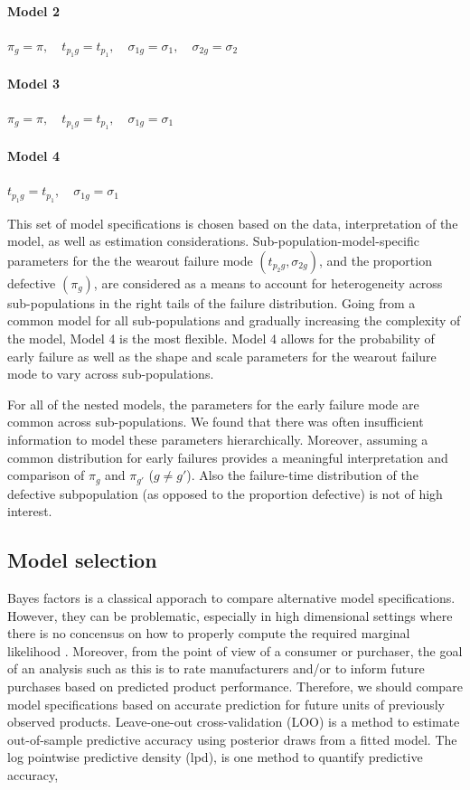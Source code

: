 \documentclass[12pt]{article}
\begin{document}
\paragraph{Model 2} $\pi_{g} = \pi,\quad t_{p_{1}g} = t_{p_1},\quad \sigma_{1g}=\sigma_1,\quad \sigma_{2g} = \sigma_2$
\paragraph{Model 3} $\pi_{g} = \pi,\quad  t_{p_{1}g}= t_{p_1},\quad \sigma_{1g}=\sigma_1$
\paragraph{Model 4} $t_{p_{1}g}= t_{p_1},\quad \sigma_{1g}=\sigma_1$


This set of model specifications is chosen based on the data, interpretation of the model, as well as estimation considerations.  Sub-population-model-specific parameters for the the wearout failure mode $(t_{p_{2}g},\sigma_{2g})$, and the proportion defective $(\pi_g)$, are considered as a means to account for heterogeneity across sub-populations in the right tails of the failure distribution.  Going from a common model for all sub-populations and gradually increasing the complexity of the model, Model 4 is the most flexible.  Model 4 allows for the probability of early failure as well as the shape and scale parameters for the wearout failure mode to vary across sub-populations.

For all of the nested models, the parameters for the early failure mode are common across sub-populations.  We found that there was often insufficient information to model these parameters hierarchically.  Moreover, assuming a common distribution for early failures provides a meaningful interpretation and comparison of $\pi_g$ and $\pi_{g'}$ ($g \neq g'$). Also the failure-time distribution of the defective subpopulation (as opposed to the proportion defective) is not of high interest.

\subsection{Model selection}
Bayes factors is a classical apporach to compare alternative model specifications.  However, they can be problematic, especially in high dimensional settings where there is no concensus on how to properly compute the required marginal likelihood \citep{robert2016}. Moreover, from the point of view of a consumer or purchaser, the goal of an analysis such as this is to rate manufacturers and/or to inform future purchases based on predicted product performance. Therefore, we should compare model specifications based on accurate prediction for future units of previously observed products.  Leave-one-out cross-validation (LOO) is a method to estimate out-of-sample predictive accuracy using
posterior draws from a fitted model.  The log pointwise predictive density (lpd), is one method to quantify predictive accuracy,
\end{document}
